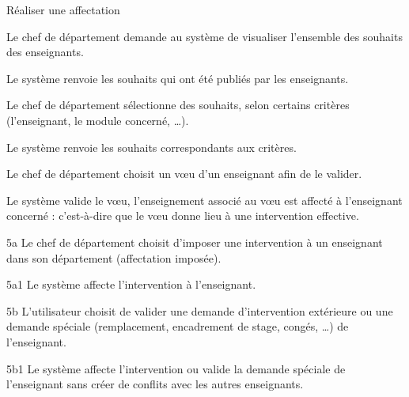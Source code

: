 \begin{usecase}{Réaliser une affectation}
\begin{information}
\end{information}
 \begin{scenario}
 \item Le chef de département demande au système de visualiser l'ensemble des souhaits des enseignants.
 \item Le système renvoie les souhaits qui ont été publiés par les enseignants.
 \item Le chef de département sélectionne des souhaits, selon certains critères (l'enseignant, le module concerné, \dots).
 \item Le système renvoie les souhaits correspondants aux critères.  
 \item Le chef de département choisit un v\oe u d'un enseignant afin de le valider.
 \item Le système valide le v\oe u, l'enseignement associé au v\oe u est affecté à l'enseignant concerné : c'est-à-dire que le v\oe u donne lieu à une intervention effective.\\
 \end{scenario}

 \begin{extension}
 \item [5a] Le chef de département choisit d'imposer une intervention à un enseignant dans son département (affectation imposée).
 \item [5a1] Le système affecte l'intervention à l'enseignant.
 \item [5b] L'utilisateur choisit de valider une demande d'intervention extérieure ou une demande spéciale (remplacement, encadrement de stage, congés, \dots) de l'enseignant.
 \item [5b1] Le système affecte l'intervention ou valide la demande spéciale de l'enseignant sans créer de conflits avec les autres enseignants.\\
 \end{extension}
\end{usecase}

